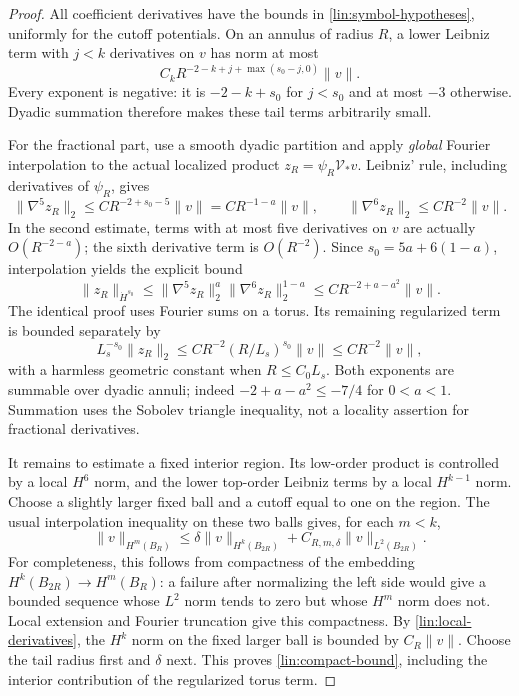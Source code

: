 \begin{proof}
All coefficient derivatives have the bounds in
\eqref{lin:symbol-hypotheses}, uniformly for the cutoff potentials.
On an annulus of radius $R$, a lower Leibniz term with $j<k$ derivatives
on $v$ has norm at most
\begin{equation}\label{lin:top-tail}
 C_kR^{-2-k+j+\max(s_0-j,0)}\|v\|.
\end{equation}
Every exponent is negative: it is $-2-k+s_0$ for $j<s_0$ and at most
$-3$ otherwise.  Dyadic summation therefore makes these tail terms
arbitrarily small.

For the fractional part, use a smooth dyadic partition and apply
\emph{global} Fourier interpolation to the actual localized product
$z_R=\psi_R\mathcal V_*v$.  Leibniz' rule, including derivatives of
$\psi_R$, gives
\[
 \|\nabla^5z_R\|_2\le CR^{-2+s_0-5}\|v\|
                     =CR^{-1-a}\|v\|,
 \qquad
 \|\nabla^6z_R\|_2\le CR^{-2}\|v\|.
\]
In the second estimate, terms with at most five derivatives on $v$ are
actually $O(R^{-2-a})$; the sixth derivative term is $O(R^{-2})$.
Since $s_0=5a+6(1-a)$, interpolation yields the explicit bound
\begin{equation}\label{lin:fractional-tail}
 \|z_R\|_{\dot H^{s_0}}
 \le\|\nabla^5z_R\|_2^a\|\nabla^6z_R\|_2^{1-a}
 \le CR^{-2+a-a^2}\|v\|.
\end{equation}
The identical proof uses Fourier sums on a torus.  Its remaining
regularized term is bounded separately by
\begin{equation}\label{lin:zero-mode-tail}
 L_s^{-s_0}\|z_R\|_2
 \le CR^{-2}(R/L_s)^{s_0}\|v\|
 \le CR^{-2}\|v\|,
\end{equation}
with a harmless geometric constant when $R\le C_0L_s$.
Both exponents are summable over dyadic annuli; indeed
$-2+a-a^2\le-7/4$ for $0<a<1$.  Summation uses the Sobolev triangle
inequality, not a locality assertion for fractional derivatives.

It remains to estimate a fixed interior region.  Its low-order product
is controlled by a local $H^6$ norm, and the lower top-order Leibniz
terms by a local $H^{k-1}$ norm.  Choose a slightly larger fixed ball
and a cutoff equal to one on the region.  The usual interpolation
inequality on these two balls gives, for each $m<k$,
\[
 \|v\|_{H^m(B_R)}
 \le\delta\|v\|_{H^k(B_{2R})}
                 +C_{R,m,\delta}\|v\|_{L^2(B_{2R})}.
\]
For completeness, this follows from compactness of the embedding
$H^k(B_{2R})\to H^m(B_R)$: a failure after normalizing the left side
would give a bounded sequence whose $L^2$ norm tends to zero but whose
$H^m$ norm does not.  Local extension and Fourier truncation give this
compactness.  By \eqref{lin:local-derivatives}, the $H^k$ norm on the
fixed larger ball is bounded by $C_R\|v\|$.  Choose the tail radius
first and $\delta$ next.  This proves \eqref{lin:compact-bound}, including
the interior contribution of the regularized torus term.
\end{proof}

